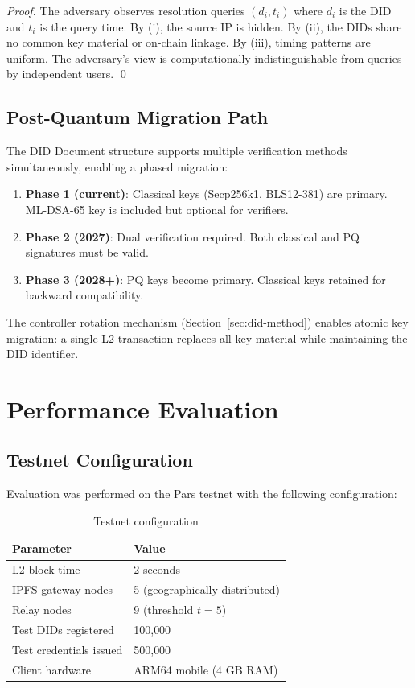 \documentclass[11pt,a4paper]{article}
\begin{document}
\begin{proof}
The adversary observes resolution queries $(d_i, t_i)$ where $d_i$ is the DID and
$t_i$ is the query time. By (i), the source IP is hidden. By (ii), the DIDs share
no common key material or on-chain linkage. By (iii), timing patterns are uniform.
The adversary's view is computationally indistinguishable from queries by independent
users. \qed
\end{proof}

\subsection{Post-Quantum Migration Path}

The DID Document structure supports multiple verification methods simultaneously,
enabling a phased migration:

\begin{enumerate}
    \item \textbf{Phase 1 (current)}: Classical keys (Secp256k1, BLS12-381) are primary.
          ML-DSA-65 key is included but optional for verifiers.
    \item \textbf{Phase 2 (2027)}: Dual verification required. Both classical and
          PQ signatures must be valid.
    \item \textbf{Phase 3 (2028+)}: PQ keys become primary. Classical keys retained
          for backward compatibility.
\end{enumerate}

The controller rotation mechanism (Section~\ref{sec:did-method}) enables atomic
key migration: a single L2 transaction replaces all key material while maintaining
the DID identifier.

\section{Performance Evaluation}
\label{sec:evaluation}

\subsection{Testnet Configuration}

Evaluation was performed on the Pars testnet with the following configuration:

\begin{table}[h]
\centering
\caption{Testnet configuration}
\label{tab:testnet-config}
\begin{tabular}{ll}
\toprule
\textbf{Parameter} & \textbf{Value} \\
\midrule
L2 block time & 2 seconds \\
IPFS gateway nodes & 5 (geographically distributed) \\
Relay nodes & 9 (threshold $t = 5$) \\
Test DIDs registered & 100{,}000 \\
Test credentials issued & 500{,}000 \\
Client hardware & ARM64 mobile (4 GB RAM) \\
\bottomrule
\end{tabular}
\end{table}
\end{document}
